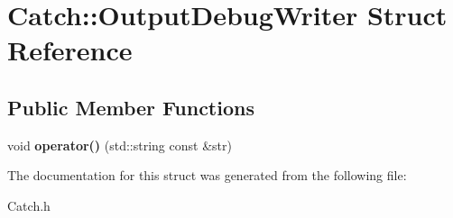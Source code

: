 \hypertarget{struct_catch_1_1_output_debug_writer}{\section{Catch\-:\-:Output\-Debug\-Writer Struct Reference}
\label{struct_catch_1_1_output_debug_writer}
}
\subsection*{Public Member Functions}
\begin{DoxyCompactItemize}
\item 
\hypertarget{struct_catch_1_1_output_debug_writer_a6ed4872c2e7b9396dce5168039362c29}{void {\bfseries operator()} (std\-::string const \&str)}\label{struct_catch_1_1_output_debug_writer_a6ed4872c2e7b9396dce5168039362c29}

\end{DoxyCompactItemize}


The documentation for this struct was generated from the following file\-:\begin{DoxyCompactItemize}
\item 
Catch.\-h\end{DoxyCompactItemize}
